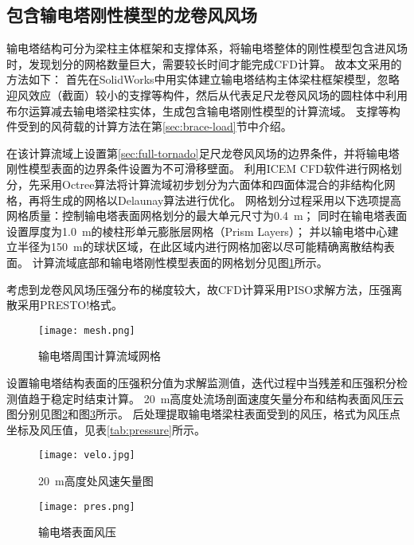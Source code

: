 \subsection{包含输电塔刚性模型的龙卷风风场}\label{sec:tornado-fsi}
输电塔结构可分为梁柱主体框架和支撑体系，将输电塔整体的刚性模型包含进风场时，发现划分的网格数量巨大，需要较长时间才能完成CFD计算。
故本文采用的方法如下：
首先在SolidWorks中用实体建立输电塔结构主体梁柱框架模型，忽略迎风效应（截面）较小的支撑等构件，然后从代表足尺龙卷风风场的圆柱体中利用布尔运算减去输电塔梁柱实体，生成包含输电塔刚性模型的计算流域。
支撑等构件受到的风荷载的计算方法在第\ref{sec:brace-load}节中介绍。

在该计算流域上设置第\ref{sec:full-tornado}足尺龙卷风风场的边界条件，并将输电塔刚性模型表面的边界条件设置为不可滑移壁面。
利用ICEM CFD软件进行网格划分，先采用Octree算法将计算流域初步划分为六面体和四面体混合的非结构化网格，再将生成的网格以Delaunay算法进行优化。
网格划分过程采用以下选项提高网格质量：控制输电塔表面网格划分的最大单元尺寸为\SI{0.4}{m}；
同时在输电塔表面设置厚度为\SI{1.0}{m}的棱柱形单元膨胀层网格（Prism Layers）；
并以输电塔中心建立半径为\SI{150}{m}的球状区域，在此区域内进行网格加密以尽可能精确离散结构表面。
计算流域底部和输电塔刚性模型表面的网格划分见图\ref{fig:mesh}所示。

考虑到龙卷风风场压强分布的梯度较大，故CFD计算采用PISO求解方法，压强离散采用PRESTO!格式\cite{fluent2015user}。

\begin{figure}[!htpb]
	\centering
	\texttt{[image: mesh.png]}
	\caption{输电塔周围计算流域网格}
	\label{fig:mesh}
\end{figure}

设置输电塔结构表面的压强积分值为求解监测值，迭代过程中当残差和压强积分检测值趋于稳定时结束计算。
\SI{20}{m}高度处流场剖面速度矢量分布和结构表面风压云图分别见图\ref{fig:velocity}和图\ref{fig:pressure}所示。
后处理提取输电塔梁柱表面受到的风压，格式为风压点坐标及风压值，见表\ref{tab:pressure}所示。

\begin{figure}[!htpb]
	\centering
	\texttt{[image: velo.jpg]}
	\caption{\SI{20}{m}高度处风速矢量图}
	\label{fig:velocity}
\end{figure}

\begin{figure}[!htpb]
	\centering
	\texttt{[image: pres.png]}
	\caption{输电塔表面风压}
	\label{fig:pressure}
\end{figure}

